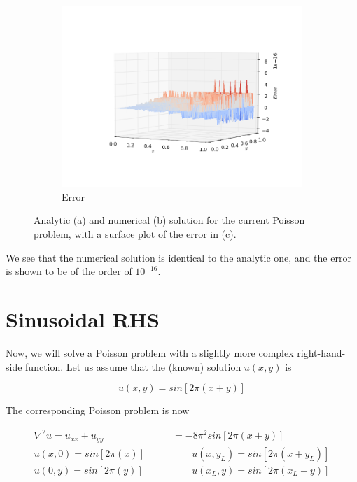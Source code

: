 \documentclass[11pt]{report}
\begin{document}
\begin{figure}[h!]
\begin{subfigure}{0.6\textwidth}
  \includegraphics[width=1.0\linewidth]{images/example2_error}
  \caption{Error}
  \label{fig:sub2.3}
\end{subfigure}
\caption{Analytic (a) and numerical (b) solution for the current Poisson problem, with a surface plot of the  error in (c).}
\label{fig:example2}
\end{figure}

We see that the numerical solution is identical to the analytic one, and the error is shown to be of the order of $10^{-16}$. 

\newpage
\section{Sinusoidal RHS}
Now, we will solve a Poisson problem with a slightly more complex right-hand-side function. Let us assume that the (known) solution $u(x,y)$ is 

\begin{equation}
u(x,y) = sin\left[ 2\pi \left( x + y\right) \right]
\end{equation}

The corresponding Poisson problem is now

\begin{subequations}
\begin{align}
\nabla ^2 u = u_{xx} + u_{yy} &= -8\pi^2 sin\left[ 2\pi \left( x + y\right) \right] \\
u(x,0) = sin\left[ 2\pi \left( x \right) \right] \quad \quad & \quad \quad 
u(x,y_L) = sin\left[ 2\pi \left( x + y_L\right) \right]\\
u(0,y) =  sin\left[ 2\pi \left( y \right) \right] \quad \quad & \quad \quad 
u(x_L,y) =  sin\left[ 2\pi \left( x_L + y\right) \right]
\end{align}
\end{subequations}
\end{document}
